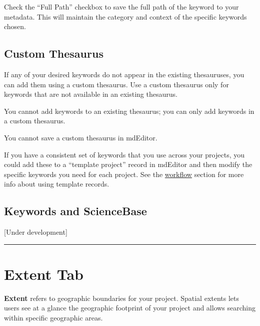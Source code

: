 \documentclass[
]{book}
\makeatletter
\newenvironment{kframe}{%
\medskip{}
\setlength{\fboxsep}{.8em}
 \def\at@end@of@kframe{}%
 \ifinner\ifhmode%
  \def\at@end@of@kframe{\end{minipage}}%
  \begin{minipage}{\columnwidth}%
 \fi\fi%
 \def\FrameCommand##1{\hskip\@totalleftmargin \hskip-\fboxsep
 \colorbox{shadecolor}{##1}\hskip-\fboxsep
     \hskip-\linewidth \hskip-\@totalleftmargin \hskip\columnwidth}%
 \MakeFramed {\advance\hsize-\width
   \@totalleftmargin\z@ \linewidth\hsize
   \@setminipage}}%
 {\par\unskip\endMakeFramed%
 \at@end@of@kframe}
\newenvironment{rmdblock}[1]
  {
  \begin{itemize}
  \renewcommand{\labelitemi}{
    \raisebox{-.7\height}[0pt][0pt]{
      {\setkeys{Gin}{width=3em,keepaspectratio}\texttt{[image: images/\#1]}}
    }
  }
  \setlength{\fboxsep}{1em}
  \begin{kframe}
  \item
  }
  {
  \end{kframe}
  \end{itemize}
  }
\newenvironment{rmdtip}
  {\begin{rmdblock}{tip}}
  {\end{rmdblock}}
\makeatother
\begin{document}
\begin{rmdtip}
Check the ``Full Path'' checkbox to save the full path of the keyword to
your metadata. This will maintain the category and context of the
specific keywords chosen.
\end{rmdtip}

\hypertarget{custom-thesaurus}{%
\subsection*{Custom Thesaurus}\label{custom-thesaurus}}

If any of your desired keywords do not appear in the existing thesauruses, you can add them using a custom thesaurus. Use a custom thesaurus only for keywords that are not available in an existing thesaurus.

You cannot add keywords to an existing thesaurus; you can only add keywords in a custom thesaurus.

You cannot save a custom thesaurus in mdEditor.

\begin{rmdtip}
If you have a consistent set of keywords that you use across your
projects, you could add these to a ``template project'' record in
mdEditor and then modify the specific keywords you need for each
project. See the \protect\hyperlink{workflow}{workflow} section for more
info about using template records.
\end{rmdtip}

\hypertarget{keywords-and-sciencebase}{%
\subsection*{Keywords and ScienceBase}\label{keywords-and-sciencebase}}

{[}Under development{]}

\begin{center}\rule{0.5\linewidth}{\linethickness}\end{center}

\hypertarget{project-extent}{%
\section*{Extent Tab}\label{project-extent}}

\textbf{Extent} refers to geographic boundaries for your project. Spatial extents lets users see at a glance the geographic footprint of your project and allows searching within specific geographic areas.
\end{document}
